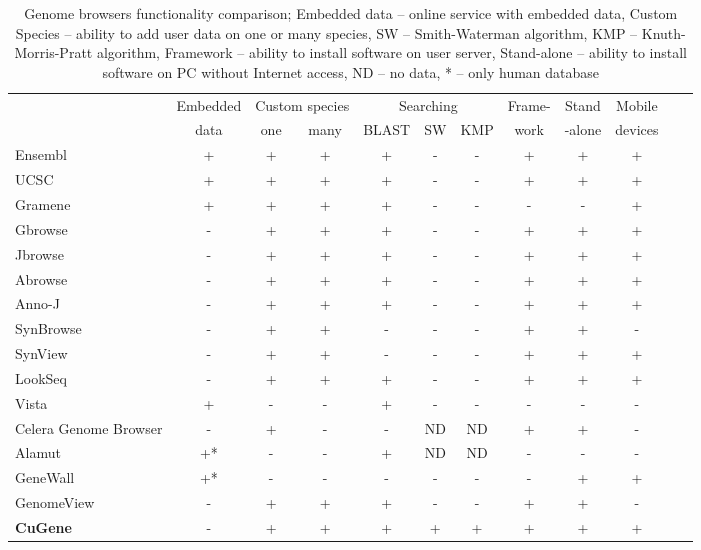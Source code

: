 \documentclass[a4paper]{spie}
\newcommand{\appName}{CuGene}
\begin{document}
\begin{table}

  \centering

  \begin{tabular}{|l|c|c|c|c|c|c|c|c|c|p{1cm}|p{1cm}|} \hline
    ~ & Embedded & \multicolumn{2}{|c|}{Custom species}
    & \multicolumn{3}{|c|}{Searching} & Frame- & Stand & Mobile \\
    ~ & data & one & many
    & BLAST & SW & KMP & work & -alone & devices \\ \hline
    Ensembl               & + & + & + &  + & - & - &  + &+ & +  \\ \hline
    UCSC                  & + & + & + &  + & - & - &  + &+ & +  \\ \hline
    Gramene               & + & + & + &  + & - & - &  - &- & +  \\ \hline
    Gbrowse               & - & + & + &  + & - & - &  + &+ & +  \\ \hline
    Jbrowse               & - & + & + &  + & - & - &  + &+ & +  \\ \hline
    Abrowse               & - & + & + &  + & - & - &  + &+ & +  \\ \hline
    Anno-J                & - & + & + &  + & - & - &  + &+ & +  \\ \hline
    SynBrowse             & - & + & + &  - & - & - &  + &+ & -  \\ \hline
    SynView               & - & + & + &  - & - & - &  + &+ & +  \\ \hline
    LookSeq               & - & + & + &  + & - & - &  + &+ & +  \\ \hline
    Vista                 & + & - & - &  + & - & - &  - &- & -  \\ \hline
    Celera Genome Browser & - & + & - &  - & ND& ND&  + &+ & -  \\ \hline
    Alamut                & +*& - & - &  + & ND& ND&  - &- & -  \\ \hline
    GeneWall              & +*& - & - &  - & - & - &  - &+ & +  \\ \hline
    GenomeView            & - & + & + &  + & - & - &  + &+ & -  \\ \hline
    \textbf{\appName{}}   & - & + & + &  + & + & + &  + &+ & +  \\ \hline
  \end{tabular}

  \caption{Genome browsers functionality comparison; Embedded data -- online service with embedded data,
    Custom Species -- ability to add user data on one or many species,
    SW -- Smith-Waterman algorithm, KMP -- Knuth-Morris-Pratt algorithm,
    Framework -- ability to install software on user server, Stand-alone -- ability to install software on PC without Internet access,
    ND -- no data, * -- only human database}
  \label{tab:comparison}

\end{table}
\end{document}
